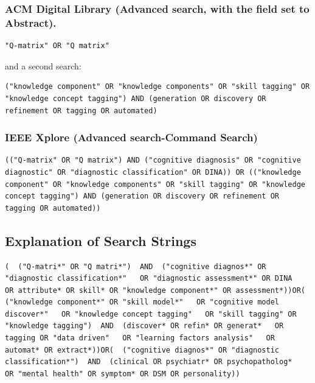 \documentclass[sigconf,nonacm]{acmart}
\begin{document}
\subsubsection{ACM Digital Library (Advanced search, with the field set to Abstract).}

\begin{lstlisting}[style=searchquery]
"Q-matrix" OR "Q matrix"
\end{lstlisting}

and a second search:

\begin{lstlisting}[style=searchquery]
("knowledge component" OR "knowledge components" OR "skill tagging" OR "knowledge concept tagging") AND (generation OR discovery OR refinement OR tagging OR automated)
\end{lstlisting}

\subsubsection{IEEE Xplore (Advanced search-Command Search)}

\begin{lstlisting}[style=searchquery]
(("Q-matrix" OR "Q matrix") AND ("cognitive diagnosis" OR "cognitive diagnostic" OR "diagnostic classification" OR DINA)) OR (("knowledge component" OR "knowledge components" OR "skill tagging" OR "knowledge concept tagging") AND (generation OR discovery OR refinement OR tagging OR automated))
\end{lstlisting}

\subsection{Explanation of Search Strings}

\begin{lstlisting}[style=searchquery]
(  ("Q-matri*" OR "Q matri*")  AND  ("cognitive diagnos*" OR "diagnostic classification*"   OR "diagnostic assessment*" OR DINA   OR attribute* OR skill* OR "knowledge component*" OR assessment*))OR(  ("knowledge component*" OR "skill model*"   OR "cognitive model discover*"   OR "knowledge concept tagging"   OR "skill tagging" OR "knowledge tagging")  AND  (discover* OR refin* OR generat*   OR tagging OR "data driven"   OR "learning factors analysis"   OR automat* OR extract*))OR(  ("cognitive diagnos*" OR "diagnostic classification*")  AND  (clinical OR psychiatr* OR psychopatholog*   OR "mental health" OR symptom* OR DSM OR personality))
\end{lstlisting}
\end{document}

